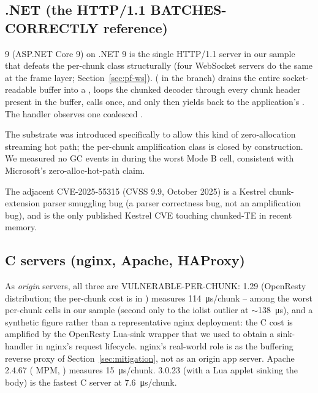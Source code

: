 \subsection{.NET (the HTTP/1.1 BATCHES-CORRECTLY reference)}
\label{sec:pf-dotnet}

 9 (ASP.NET Core 9) on .NET 9 is the single
HTTP/1.1 server in our sample that defeats the per-chunk class
structurally (four WebSocket servers do the same at the frame
layer; Section~\ref{sec:pf-ws}). 
(
in the  branch) drains the entire socket-
readable buffer into a , loops
the chunked decoder through every chunk header present in the
buffer, calls  once, and only then yields
back to the application's . The
handler observes one coalesced .

The  substrate was introduced
specifically to allow this kind of zero-allocation streaming
hot path; the per-chunk amplification class is closed by
construction. We measured no GC events in 
during the worst Mode B cell, consistent with Microsoft's
zero-alloc-hot-path claim.

The adjacent CVE-2025-55315 (CVSS 9.9, October 2025) is a Kestrel
chunk-extension parser smuggling bug (a parser correctness bug,
not an amplification bug), and is the only published Kestrel CVE
touching chunked-TE in recent memory.

\subsection{C servers (nginx, Apache, HAProxy)}
\label{sec:pf-c}

As \emph{origin} servers, all three are VULNERABLE-PER-CHUNK:
 1.29 (OpenResty distribution; the per-chunk cost is
in ) measures
\SI{114}{\micro\second}/chunk -- among the worst per-chunk cells in
our sample (second only to the  iolist outlier at
$\sim$\SI{138}{\micro\second}), and a synthetic figure rather than
a representative nginx deployment: the C cost is amplified by the
OpenResty Lua-sink wrapper that we used to obtain a sink-handler in
nginx's request lifecycle. nginx's real-world role is as the
buffering reverse proxy of Section~\ref{sec:mitigation}, not as an
origin app server. Apache  2.4.67 ( MPM,
) measures \SI{15}{\micro\second}/chunk.
 3.0.23 (with a Lua applet sinking the body) is the
fastest C server at \SI{7.6}{\micro\second}/chunk.

